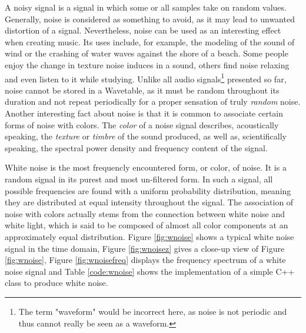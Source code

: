 A noisy signal is a signal in which some or all samples take on random values. Generally, noise is considered as something to avoid, as it may lead to unwanted distortion of a signal. Nevertheless, noise can be used as an interesting effect when creating music. Its uses include, for example, the modeling of the sound of wind or the crashing of water waves against the shore of a beach. Some people enjoy the change in texture noise induces in a sound, others find noise relaxing and even listen to it while studying.  Unlike all audio signals\footnote{The term "waveform" would be incorrect here, as noise is not periodic and thus cannot really be seen as a waveform.} presented so far, noise cannot\footnotemark{} be stored in a Wavetable, as it must be random throughout its duration and not repeat periodically for a proper sensation of truly \emph{random} noise. Another interesting fact about noise is that it is common to associate certain forms of noise with colors. The \emph{color} of a noise signal describes, acoustically speaking, the \emph{texture} or \emph{timbre} \footnotemark[4]{} of the sound produced, as well as, scientifically speaking, the spectral power density and frequency content of the signal. \vspace{\baselineskip}

White noise is the most frequencly encountered form, or color, of noise. It is a random signal in its purest and most un-filtered form. In such a signal, all possible frequencies are found with a uniform probability distribution, meaning they are distributed at equal intensity throughout the signal. The association of noise with colors actually stems from the connection between white noise and white light, which is said to be composed of almost all color components at an approximately equal distribution. Figure \ref{fig:wnoise} shows a typical white noise signal in the time domain, Figure \ref{fig:wnoisez} gives a close-up view of Figure \ref{fig:wnoise}, Figure \ref{fig:wnoisefreq} displays the frequency spectrum of a white noise signal and Table \ref{code:wnoise} shows the implementation of a simple C++ class to produce white noise.



